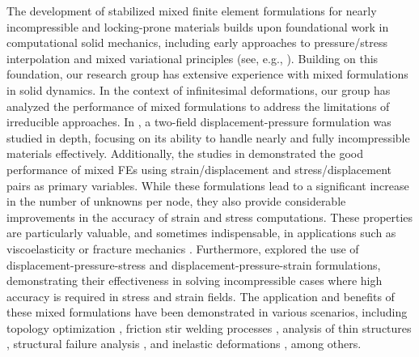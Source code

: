 \documentclass[11pt,english]{article}
\begin{document}
The development of stabilized mixed finite element formulations for nearly incompressible and locking-prone materials builds upon foundational work in computational solid mechanics, including early approaches to pressure/stress interpolation and mixed variational principles (see, e.g., \cite{Simo,BoffiBrezziFortin2013}). Building on this foundation, our research group has extensive experience with mixed formulations in solid dynamics. In the context of infinitesimal deformations, our group has analyzed the performance of mixed formulations to address the limitations of irreducible approaches. In \cite{ChiumentiCervera2002,BaigesCodina2017}, a two-field displacement-pressure formulation was studied in depth, focusing on its ability to handle nearly and fully incompressible materials effectively. Additionally, the studies in \cite{ChiumentiCerveraCodina2010,ChiumentiCerveraCodina2010_2} demonstrated the good performance of mixed FEs using strain/displacement and stress/displacement pairs as primary variables. While these formulations lead to a significant increase in the number of unknowns per node, they also provide considerable improvements in the accuracy of strain and stress computations. These properties are particularly valuable, and sometimes indispensable, in applications such as viscoelasticity or fracture mechanics \cite{Cervera2022}. Furthermore, \cite{ChiumentiCerveraCodina2015} explored the use of displacement-pressure-stress and displacement-pressure-strain formulations, demonstrating their effectiveness in solving incompressible cases where high accuracy is required in stress and strain fields. The application and benefits of these mixed formulations have been demonstrated in various scenarios, including topology optimization \cite{Castanar2022}, friction stir welding processes \cite{Venghauss2023}, analysis of thin structures \cite{aguirre1}, structural failure analysis \cite{Moreira2022}, and inelastic deformations \cite{Chiumenti2021}, among others. 
\end{document}
